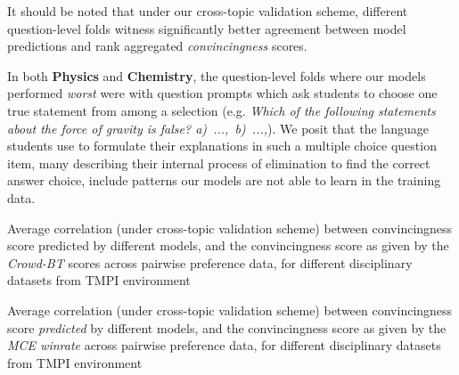 \documentclass[notitlepage,12pt]{jedm}
\begin{document}
It should be noted that under our cross-topic validation scheme, different 
question-level folds witness significantly better agreement between model 
predictions and rank aggregated \textit{convincingness} scores.

In both \textbf{Physics} and \textbf{Chemistry}, the question-level folds where 
our models performed \textit{worst} were with question prompts which ask 
students to choose one true statement from among a selection (e.g. 
\textit{Which of the following statements about the force of gravity is 
false? \mbox{a) ..., b) ...,}}).
We posit that the language students use to formulate their explanations in such 
a multiple choice question item, many describing their internal process of 
elimination to find the correct answer choice, include patterns our models are 
not able to learn in the training data.

\begin{table}
	\parbox{.45\linewidth}{
		\centering
		
	}
	\hfill
	\parbox{.45\linewidth}{
		\centering
		
	}
	\caption{
		Average correlation (under cross-topic validation scheme) between 
		convincingness score predicted by different models, and the 
		convincingness score as given by the \textit{Crowd-BT} scores across 
		pairwise preference data, for different disciplinary datasets from TMPI 
		environment
	}
	\label{tab:dalite_crowdBT}
\end{table}

\begin{table}
	\parbox{.45\linewidth}{
		\centering
		
	}
	\hfill
	\parbox{.45\linewidth}{
	\centering
		
	}
	\caption{
		Average correlation (under cross-topic validation scheme) between 
		convincingness score \textit{predicted} by different models, and the 
		convincingness score as given by the \textit{MCE winrate} across 
		pairwise preference data, for different disciplinary datasets from TMPI 
		environment
	}
	\label{tab:dalite_winrate_nopairs}
\end{table}
\end{document}
